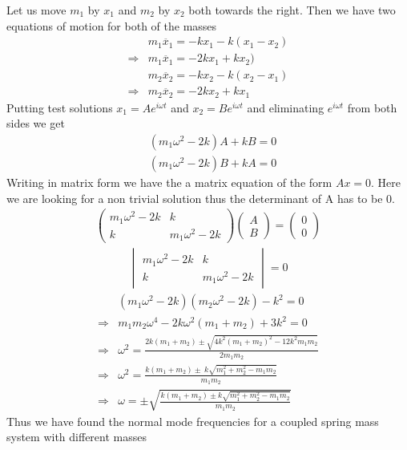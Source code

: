 \documentclass[addpoints]{exam}
\begin{document}
\begin{questions}
\begin{solution}
    Let us move $m_1$ by $x_1$ and $m_2$ by $x_2$ both towards the right. Then we have two equations of motion for both of the masses
    \begin{align}
        &m_1\ddot{x_1} = -kx_1 -k(x_1-x_2)\nonumber\\
       \Rightarrow & m_1\ddot{x_1} = -2kx_1+kx_2)\\ 
        & m_2\ddot{x_2} = -kx_2 -k(x_2-x_1)\nonumber\\ 
       \Rightarrow & m_2\ddot{x_2} = -2kx_2 + kx_1
    \end{align}
    Putting test solutions $x_1 = Ae^{i\omega t}$ and $x_2=Be^{i\omega t}$ and eliminating $e^{i\omega t}$ from both sides we get
    \begin{align*}
        &(m_1\omega^2 - 2k)A + kB = 0 \\ 
        &(m_1\omega^2 - 2k)B + kA = 0
    \end{align*}
    Writing in matrix form we have the a matrix equation of the form $Ax=0$. Here we are looking for a non trivial solution thus the determinant of A has to be 0.
    \begin{align*}
        \begin{pmatrix}
            m_{1} \omega ^{2} -2k & k\\
            k & m_{1} \omega ^{2} -2k
        \end{pmatrix}  
        \begin{pmatrix}
            A\\
            B
        \end{pmatrix} = 
        \begin{pmatrix}
        0\\
        0
        \end{pmatrix}
    \end{align*}
    \begin{align*}
       \begin{vmatrix}
            m_{1} \omega ^{2} -2k & k\\
            k & m_{1} \omega ^{2} -2k
        \end{vmatrix}= 0
    \end{align*}
    \begin{align*}
        &(m_1\omega^2-2k)(m_2\omega^2 - 2k) - k^2 = 0 \\ 
        \Rightarrow & m_1m_2\omega^4 -2k\omega^2(m_1+m_2) + 3k^2 = 0 \\ 
        \Rightarrow & \omega^2 = \frac{2k(m_1+m_2) \pm \sqrt{4k^2(m_1+m_2)^2 - 12k^2m_1m_2}}{2m_1m_2} \\ 
        \Rightarrow & \omega^2 = \frac{k(m_1+m_2) \pm\ k\sqrt{m_1^2+m_2^2 - m_1m_2}}{m_1m_2}\\
        \Rightarrow & \omega = \pm \sqrt{\frac{k(m_1+m_2) \pm k\sqrt{m_1^2+m_2^2 - m_1m_2}}{m_1m_2}}
    \end{align*}
    Thus we have found the normal mode frequencies for a coupled spring mass system with different masses
\end{solution}



\end{questions}
\end{document}
